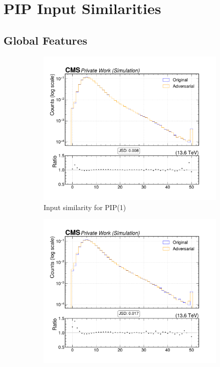 \section{PIP Input Similarities}
\label{appendix:intprob}

\subsection*{Global Features}

\begin{figure}[htbp]
  \centering
  \begin{subfigure}[t]{0.32\textwidth}
    \includegraphics[width=\linewidth]{media/output/features/compare/intprob_1/cmp_global_features_n_Cpfcand.pdf}
    \caption{Input similarity for PIP(1)}
  \end{subfigure}\hfill
  \begin{subfigure}[t]{0.32\textwidth}
    \includegraphics[width=\linewidth]{media/output/features/compare/intprob_2/cmp_global_features_n_Cpfcand.pdf}

\end{subfigure}
\end{figure}
